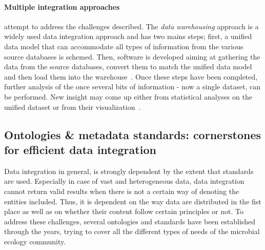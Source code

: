       \paragraph{Multiple integration approaches} attempt to address the challenges described. 
      The \textit{data warehousing} approach is a widely used data integration approach and has two mains steps; 
      first, a unified data model that can accommodate all types of  
      information from the various source databases is schemed.
      Then, software is developed aiming at  
      gathering the data from the source databases, 
      convert them to match the unified data model and 
      then load them into the warehouse~\cite{stein2003integrating}.
      Once these steps have been completed, further analysis of the once
      several bits of information - now a single dataset, can be performed.
      New insight may come up either from statistical analyses on the unified
      dataset or from their visualization~\cite{leonelli2013integrating}.  

   \subsection{Ontologies \& metadata standards: cornerstones for efficient data integration}

      Data integration in general, 
      is strongly dependent by the extent that standards are used. 
      Especially in case of vast and heterogeneous data, 
      data integration cannot return valid results 
      when there is not a certain way
      of denoting the entities included.
      Thus, it is dependent on the way data are distributed in the fist place 
      as well as on whether their content follow certain principles or not. 
      To address these challenges, several ontologies and standards have 
      been established through the years, trying to cover all the different 
      types of needs of the microbial ecology community. 


